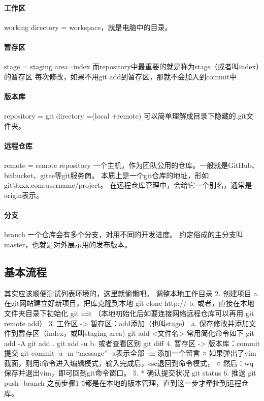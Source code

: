 \documentclass[../Main/thesis]{subfiles}
\begin{document}
\paragraph{工作区}
working directory = workspace，就是电脑中的目录。

\paragraph{暂存区}

stage = staging area=index
而repository中最重要的就是称为stage（或者叫index）的暂存区
每次修改，如果不用git add到暂存区，那就不会加入到commit中

\paragraph{版本库}

repository = git directory =(local +remote)
可以简单理解成目录下隐藏的.git文件夹。

\paragraph{远程仓库}
remote = remote repository
一个主机，作为团队公用的仓库。一般就是GitHub、bitbucket、gitee等git服务商。
本质上是一个git仓库的地址，形如 git@xxx.com:username/project。
在远程仓库管理中，会给它一个别名，通常是origin表示。

\paragraph{分支}
branch
一个仓库会有多个分支，对用不同的开发进度。
约定俗成的主分支叫master，也就是对外展示用的发布版本。

\subsection{基本流程} \label{ssc:git-workflow}

其实应该顺便测试列表环境的，这里就偷懒吧。
调整本地工作目录
2. 创建项目
a. 在git网站建立好新项目，把库克隆到本地
git clone http://
b. 或者，直接在本地文件夹目录下初始化
git init
（本地初始化后如要连接网络远程仓库可以再用 git remote add）
3. 工作区 -> 暂存区：add添加（也叫stage）
a. 保存修改并添加文件到暂存区（index，或叫staging area)
git add <文件名>
常用简化命令如下
git add -A %
git add .  %
git add -u %
b. 或者查看区别
git diff
4. 暂存区 -> 版本库：commit提交
git commit -a -m “message”
-a表示全部 -m 添加一个留言
○ 如果弹出了vim截面，则用i命令进入编辑模式，输入完成后，esc退回到命令模式，
○ 然后：wq保存并退出vim，即可回到git命令窗口。
5. * 确认提交状况  git status
6. 推送 git push -branch
之前步骤1-5都是在本地的版本管理，直到这一步才牵扯到远程仓库。
\end{document}
